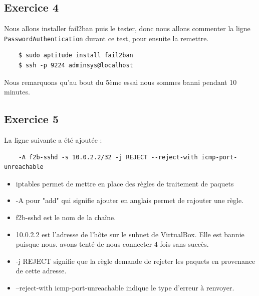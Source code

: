 \documentclass{report}
\begin{document}
\subsection{Exercice 4}
Nous allons installer fail2ban puis le tester, donc nous allons commenter la ligne \texttt{PasswordAuthentication}
durant ce test, pour ensuite la remettre.
\begin{tcolorbox}
  \begin{verbatim}
    $ sudo aptitude install fail2ban
    $ ssh -p 9224 adminsys@localhost
  \end{verbatim}
\end{tcolorbox}
Nous remarquons qu'au bout du 5ème essai nous sommes banni pendant 10 minutes.

\subsection{Exercice 5}
La ligne suivante a été ajoutée :
\begin{tcolorbox}
  \begin{verbatim}
    -A f2b-sshd -s 10.0.2.2/32 -j REJECT --reject-with icmp-port-unreachable
  \end{verbatim}
\end{tcolorbox}
\begin{itemize}
  \item iptables permet de mettre en place des règles de traitement de paquets
  \item -A pour "add" qui signifie ajouter en anglais permet de rajouter une règle.
  \item f2b-sshd est le nom de la chaîne.
  \item 10.0.2.2 est l'adresse de l'hôte sur le subnet de VirtualBox. Elle est bannie puisque nous.
  avons tenté de nous connecter 4 fois sans succès.
  \item -j REJECT signifie que la règle demande de rejeter les paquets en provenance de cette adresse.
  \item --reject-with icmp-port-unreachable indique le type d'erreur à renvoyer.
\end{itemize}
\end{document}
